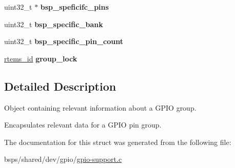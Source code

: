 \begin{DoxyCompactItemize}
uint32\+\_\+t $\ast$ {\bfseries bsp\+\_\+speficifc\+\_\+pins}
\item 
\mbox{\label{structrtems__gpio__group_a7ad99c8faea4251a46e23f69c30e181f}} 
uint32\+\_\+t {\bfseries bsp\+\_\+specific\+\_\+bank}
\item 
\mbox{\label{structrtems__gpio__group_abc012398738ef0c6fa2097808f081251}} 
uint32\+\_\+t {\bfseries bsp\+\_\+specific\+\_\+pin\+\_\+count}
\item 
\mbox{\label{structrtems__gpio__group_a34d842d50b78b985602e1e9c56b84614}} 
\mbox{\hyperlink{group__ClassicTasks_gab20892b814dced7dd4e5b9bf42becd57}{rtems\+\_\+id}} {\bfseries group\+\_\+lock}
\end{DoxyCompactItemize}


\subsection{Detailed Description}
Object containing relevant information about a G\+P\+IO group. 

Encapsulates relevant data for a G\+P\+IO pin group. 

The documentation for this struct was generated from the following file\+:\begin{DoxyCompactItemize}
\item 
bsps/shared/dev/gpio/\mbox{\hyperlink{gpio-support_8c}{gpio-\/support.\+c}}\end{DoxyCompactItemize}
